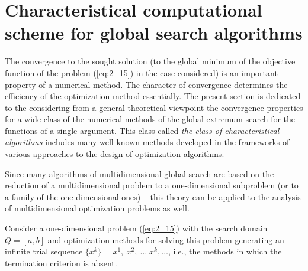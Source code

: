 \section{Characteristical computational scheme for global search algorithms}
\label{sec:2_3}
The convergence to the sought solution (to the global minimum of the objective function of the problem (\ref{eq:2_15}) in the case considered) is an important property of a numerical method. The character of convergence determines the efficiency of the optimization method essentially. The present section is dedicated to the considering from a general theoretical viewpoint the convergence properties for a wide class of the numerical methods of the global extremum search for the functions of a single argument. This class called  \textit{the class of characteristical algorithms} includes many well-known methods  developed in the frameworks of various approaches to the design of optimization algorithms. 

Since many algorithms of multidimensional global search are based on the reduction of a multidimensional problem to a one-dimensional subproblem (or to a family of the one-dimensional ones) ~\cite{2_CarrHowe, 2_GerGriGer, 2_Goertzel, 2_SergStrLeraMonogr, 2_ShiOlaf, 2_StrSergMon2000} this theory can be applied to the analysis of multidimensional optimization problems as well. 

Consider a one-dimensional problem (\ref{eq:2_15}) with the search domain $Q=[a,b]$  and  optimization methods for solving this problem generating an infinite trial sequence $\{x^k\}=x^1,\:x^2,\:\ldots\;x^k,\ldots$, i.e., the methods in which the termination criterion is absent. 

